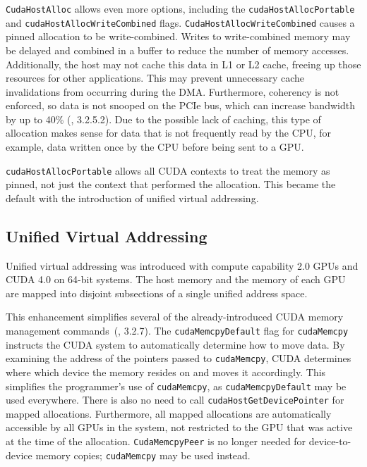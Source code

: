 \begin{sloppypar}
\texttt{CudaHostAlloc} allows even more options, including the \texttt{cudaHostAllocPortable} and \texttt{cudaHostAllocWriteCombined} flags.
\texttt{CudaHostAllocWriteCombined} causes a pinned allocation to be write-combined.
Writes to write-combined memory may be delayed and combined in a buffer to reduce the number of memory accesses.
Additionally, the host may not cache this data in L1 or L2 cache, freeing up those resources for other applications.
This may prevent unnecessary cache invalidations from occurring during the DMA.
Furthermore, coherency is not enforced, so data is not snooped on the PCIe bus, which can increase bandwidth by up to 40\% (\cite{nvidia2010cuda30}, 3.2.5.2).
Due to the possible lack of caching, this type of allocation makes sense for data that is not frequently read by the CPU, for example, data written once by the CPU before being sent to a GPU.
\end{sloppypar}

\texttt{cudaHostAllocPortable} allows all CUDA contexts to treat the memory as pinned, not just the context that performed the allocation.
This became the default with the introduction of unified virtual addressing.

\subsection{Unified Virtual Addressing}
\label{sec:uva}

Unified virtual addressing was introduced with compute capability 2.0 GPUs and CUDA 4.0 on 64-bit systems.
The host memory and the memory of each GPU are mapped into disjoint subsections of a single unified address space.

This enhancement simplifies several of the already-introduced CUDA memory management commands~(\cite{nvidia2011cudac40}, 3.2.7).
The \texttt{cudaMemcpyDefault} flag for \texttt{cudaMemcpy} instructs the CUDA system to automatically determine how to move data.
By examining the address of the pointers passed to \texttt{cudaMemcpy}, CUDA determines where which device the memory resides on and moves it accordingly.
This simplifies the programmer's use of \texttt{cudaMemcpy}, as \texttt{cudaMemcpyDefault} may be used everywhere.
There is also no need to call \texttt{cudaHostGetDevicePointer} for mapped allocations.
Furthermore, all mapped allocations are automatically accessible by all GPUs in the system, not restricted to the GPU that was active at the time of the allocation.
\texttt{CudaMemcpyPeer} is no longer needed for device-to-device memory copies; \texttt{cudaMemcpy} may be used instead.

